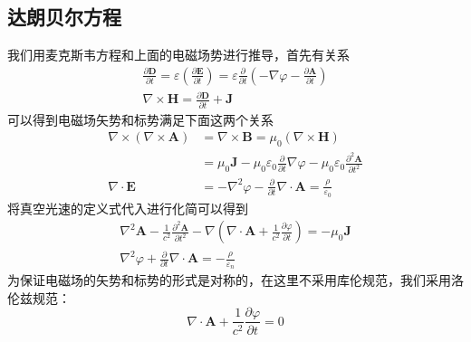     \subsection{达朗贝尔方程}
        我们用麦克斯韦方程和上面的电磁场势进行推导，首先有关系
        \begin{equation*}
            \begin{gathered}
                \frac{\partial \boldsymbol{D}}{\partial t} = \varepsilon ( \frac{\partial \boldsymbol{E}}{\partial t}) = \varepsilon  \frac{\partial }{\partial t}(-\nabla \varphi -  \frac{\partial \boldsymbol{A}}{\partial t}) \\
                \nabla \times \boldsymbol{H} =  \frac{\partial \boldsymbol{D}}{\partial t} + \boldsymbol{J}
            \end{gathered}
        \end{equation*}
        可以得到电磁场矢势和标势满足下面这两个关系
        \begin{equation}
            \begin{aligned}
                \nabla \times(\nabla \times \boldsymbol{A}) &= \nabla \times \boldsymbol{B} =\mu_0(\nabla \times \boldsymbol{H}) \\
                &= \mu_{0} \boldsymbol{J}-\mu_{0} \varepsilon_{0} \frac{\partial}{\partial t} \nabla \varphi-\mu_{0} \varepsilon_{0} \frac{\partial^{2} \boldsymbol{A}}{\partial t^{2}}\\
                \nabla \cdot \boldsymbol{E} &= -\nabla^{2} \varphi-\frac{\partial}{\partial t} \nabla \cdot \boldsymbol{A}=\frac{\rho}{\varepsilon_{0}}
            \end{aligned}
        \end{equation}
        将真空光速的定义式代入进行化简可以得到
        \begin{equation}
            \begin{gathered}
            \nabla^{2} \boldsymbol{A}-\frac{1}{c^{2}} \frac{\partial^{2} \boldsymbol{A}}{\partial t^{2}}-\nabla\left(\nabla \cdot \boldsymbol{A}+\frac{1}{c^{2}} \frac{\partial \varphi}{\partial t}\right)=-\mu_{0} \boldsymbol{J} \\
            \nabla^{2} \varphi+\frac{\partial}{\partial t} \nabla \cdot \boldsymbol{A}=-\frac{\rho}{\varepsilon_{n}}
            \end{gathered}
        \end{equation}
        为保证电磁场的矢势和标势的形式是对称的，在这里不采用库伦规范，我们采用洛伦兹规范：
        \begin{equation}
            \nabla \cdot \boldsymbol{A} + \frac{1}{c^2} \frac{\partial \varphi}{\partial t}=0
        \end{equation}
